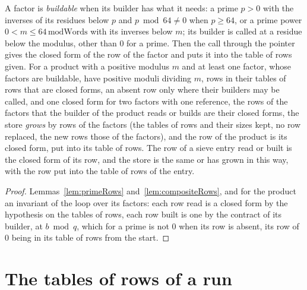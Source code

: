 \begin{lemma}\label{lem:fetchRow}
  \leanok
  A factor is \emph{buildable} when its builder has what it needs: a prime $p > 0$ with the inverses
  of its residues below $p$ and $p \bmod 64 \ne 0$ when $p \ge 64$, or a prime power
  $0 < m \le 64\,\mathrm{modWords}$ with its inverses below $m$; its builder is called at a residue
  below the modulus, other than $0$ for a prime. Then the call through the pointer gives the closed
  form of the row of the factor and puts it into the table of rows given. For a product with a
  positive modulus $m$ and at least one factor, whose factors are buildable, have positive moduli
  dividing $m$, rows in their tables of rows that are closed forms, an absent row only where their
  builders may be called, and one closed form for two factors with one reference, the rows of the
  factors that the builder of the product reads or builds are their closed forms, the store
  \emph{grows} by rows of the factors (the tables of rows and their sizes kept, no row replaced, the
  new rows those of the factors), and the row of the product is its closed form, put into its table
  of rows. The row of a sieve entry read or built is the closed form of its row, and the store is
  the same or has grown in this way, with the row put into the table of rows of the entry.
\end{lemma}

\begin{proof}
  \leanok
  Lemmas~\ref{lem:primeRows} and~\ref{lem:compositeRows}, and for the product an invariant of the
  loop over its factors: each row read is a closed form by the hypothesis on the tables of rows,
  each row built is one by the contract of its builder, at $b \bmod q$, which for a prime is not $0$
  when its row is absent, its row of $0$ being in its table of rows from the start.
\end{proof}

\section{The tables of rows of a run}\label{sec:storeRun}

